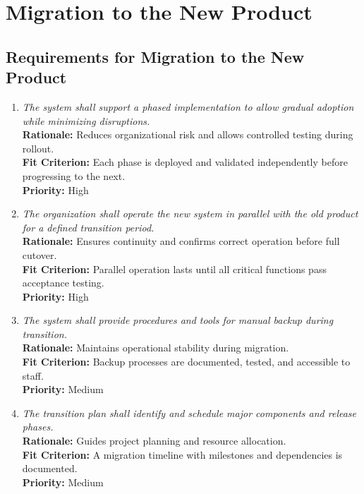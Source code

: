\documentclass[12pt]{article}
\begin{document}
\section{Migration to the New Product}
\subsection{Requirements for Migration to the New Product}
\begin{enumerate}[label=MNP-RMNP  \arabic*., wide=0pt, leftmargin=*]
  \item \emph{The system shall support a
      phased implementation to allow gradual adoption while minimizing
    disruptions.}\\
    \textbf{Rationale:} Reduces organizational risk and allows
    controlled testing during rollout.\\
    \textbf{Fit Criterion:} Each phase is deployed and validated
    independently before progressing to the next.\\
    \textbf{Priority:} High

  \item \emph{The organization shall operate
      the new system in parallel with the old product for a defined
    transition period.}\\
    \textbf{Rationale:} Ensures continuity and confirms correct
    operation before full cutover.\\
    \textbf{Fit Criterion:} Parallel operation lasts until all
    critical functions pass acceptance testing.\\
    \textbf{Priority:} High

  \item \emph{The system shall provide
    procedures and tools for manual backup during transition.}\\
    \textbf{Rationale:} Maintains operational stability during migration.\\
    \textbf{Fit Criterion:} Backup processes are documented, tested,
    and accessible to staff.\\
    \textbf{Priority:} Medium

  \item \emph{The transition plan shall
    identify and schedule major components and release phases.}\\
    \textbf{Rationale:} Guides project planning and resource allocation.\\
    \textbf{Fit Criterion:} A migration timeline with milestones and
    dependencies is documented.\\
    \textbf{Priority:} Medium
\end{enumerate}
\end{document}
